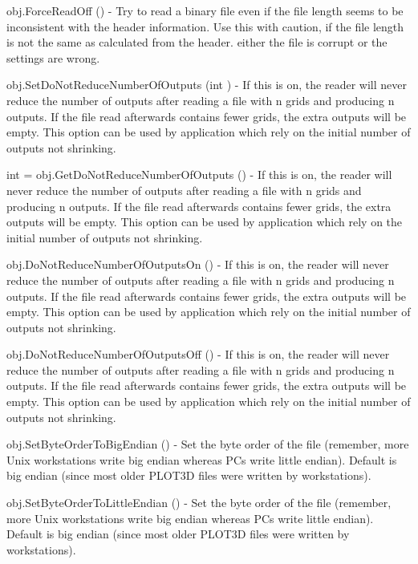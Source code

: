 \begin{DoxyItemize}
\item {\ttfamily obj.\-Force\-Read\-Off ()} -\/ Try to read a binary file even if the file length seems to be inconsistent with the header information. Use this with caution, if the file length is not the same as calculated from the header. either the file is corrupt or the settings are wrong.  
\item {\ttfamily obj.\-Set\-Do\-Not\-Reduce\-Number\-Of\-Outputs (int )} -\/ If this is on, the reader will never reduce the number of outputs after reading a file with n grids and producing n outputs. If the file read afterwards contains fewer grids, the extra outputs will be empty. This option can be used by application which rely on the initial number of outputs not shrinking.  
\item {\ttfamily int = obj.\-Get\-Do\-Not\-Reduce\-Number\-Of\-Outputs ()} -\/ If this is on, the reader will never reduce the number of outputs after reading a file with n grids and producing n outputs. If the file read afterwards contains fewer grids, the extra outputs will be empty. This option can be used by application which rely on the initial number of outputs not shrinking.  
\item {\ttfamily obj.\-Do\-Not\-Reduce\-Number\-Of\-Outputs\-On ()} -\/ If this is on, the reader will never reduce the number of outputs after reading a file with n grids and producing n outputs. If the file read afterwards contains fewer grids, the extra outputs will be empty. This option can be used by application which rely on the initial number of outputs not shrinking.  
\item {\ttfamily obj.\-Do\-Not\-Reduce\-Number\-Of\-Outputs\-Off ()} -\/ If this is on, the reader will never reduce the number of outputs after reading a file with n grids and producing n outputs. If the file read afterwards contains fewer grids, the extra outputs will be empty. This option can be used by application which rely on the initial number of outputs not shrinking.  
\item {\ttfamily obj.\-Set\-Byte\-Order\-To\-Big\-Endian ()} -\/ Set the byte order of the file (remember, more Unix workstations write big endian whereas P\-Cs write little endian). Default is big endian (since most older P\-L\-O\-T3\-D files were written by workstations).  
\item {\ttfamily obj.\-Set\-Byte\-Order\-To\-Little\-Endian ()} -\/ Set the byte order of the file (remember, more Unix workstations write big endian whereas P\-Cs write little endian). Default is big endian (since most older P\-L\-O\-T3\-D files were written by workstations).  

\end{DoxyItemize}
